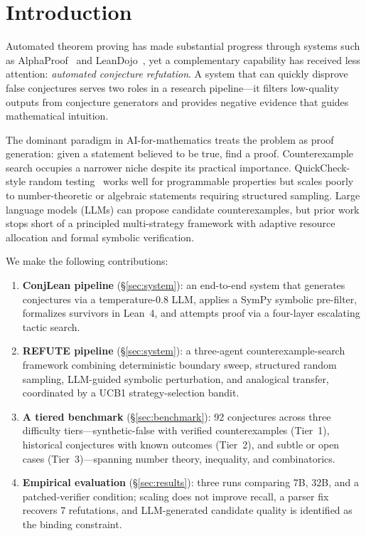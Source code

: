 \section{Introduction}
\label{sec:introduction}

Automated theorem proving has made substantial progress through systems such
as AlphaProof~\citep{alphageometry2024} and
LeanDojo~\citep{yang2023leandojo}, yet a complementary capability has
received less attention: \emph{automated conjecture refutation}.
A system that can quickly disprove false conjectures serves two roles in a
research pipeline---it filters low-quality outputs from conjecture generators
and provides negative evidence that guides mathematical intuition.

The dominant paradigm in AI-for-mathematics treats the problem as proof
generation: given a statement believed to be true, find a proof.
Counterexample search occupies a narrower niche despite its practical
importance.
QuickCheck-style random testing~\citep{claessen2000quickcheck} works well for
programmable properties but scales poorly to number-theoretic or algebraic
statements requiring structured sampling.
Large language models (LLMs) can propose candidate counterexamples, but
prior work stops short of a principled multi-strategy framework with adaptive
resource allocation and formal symbolic verification.

We make the following contributions:

\begin{enumerate}[noitemsep]
  \item \textbf{ConjLean pipeline} (\S\ref{sec:system}): an end-to-end system
    that generates conjectures via a temperature-0.8 LLM, applies a SymPy
    symbolic pre-filter, formalizes survivors in Lean~4, and attempts proof
    via a four-layer escalating tactic search.

  \item \textbf{REFUTE pipeline} (\S\ref{sec:system}): a three-agent
    counterexample-search framework combining deterministic boundary sweep,
    structured random sampling, LLM-guided symbolic perturbation, and
    analogical transfer, coordinated by a UCB1 strategy-selection bandit.

  \item \textbf{A tiered benchmark} (\S\ref{sec:benchmark}): 92 conjectures
    across three difficulty tiers---synthetic-false with verified
    counterexamples (Tier~1), historical conjectures with known outcomes
    (Tier~2), and subtle or open cases (Tier~3)---spanning number theory,
    inequality, and combinatorics.

  \item \textbf{Empirical evaluation} (\S\ref{sec:results}): three runs
    comparing 7B, 32B, and a patched-verifier condition; scaling does not
    improve recall, a parser fix recovers 7 refutations, and LLM-generated
    candidate quality is identified as the binding constraint.
\end{enumerate}

